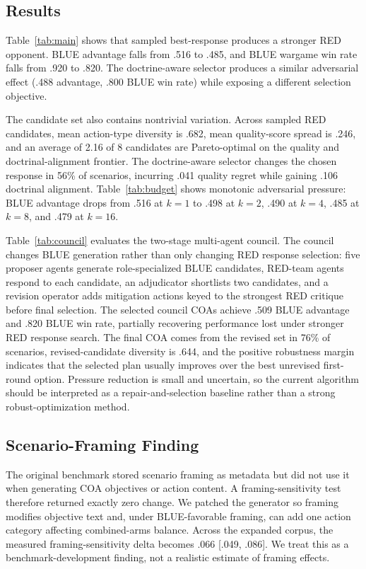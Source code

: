 \documentclass[letterpaper]{article}
\begin{document}
\subsection{Results}

Table~\ref{tab:main} shows that sampled best-response produces a stronger RED opponent. BLUE advantage falls from .516 to .485, and BLUE wargame win rate falls from .920 to .820. The doctrine-aware selector produces a similar adversarial effect (.488 advantage, .800 BLUE win rate) while exposing a different selection objective.

The candidate set also contains nontrivial variation. Across sampled RED candidates, mean action-type diversity is .682, mean quality-score spread is .246, and an average of 2.16 of 8 candidates are Pareto-optimal on the quality and doctrinal-alignment frontier. The doctrine-aware selector changes the chosen response in 56\% of scenarios, incurring .041 quality regret while gaining .106 doctrinal alignment. Table~\ref{tab:budget} shows monotonic adversarial pressure: BLUE advantage drops from .516 at $k=1$ to .498 at $k=2$, .490 at $k=4$, .485 at $k=8$, and .479 at $k=16$.

Table~\ref{tab:council} evaluates the two-stage multi-agent council. The council changes BLUE generation rather than only changing RED response selection: five proposer agents generate role-specialized BLUE candidates, RED-team agents respond to each candidate, an adjudicator shortlists two candidates, and a revision operator adds mitigation actions keyed to the strongest RED critique before final selection. The selected council COAs achieve .509 BLUE advantage and .820 BLUE win rate, partially recovering performance lost under stronger RED response search. The final COA comes from the revised set in 76\% of scenarios, revised-candidate diversity is .644, and the positive robustness margin indicates that the selected plan usually improves over the best unrevised first-round option. Pressure reduction is small and uncertain, so the current algorithm should be interpreted as a repair-and-selection baseline rather than a strong robust-optimization method.

\subsection{Scenario-Framing Finding}

The original benchmark stored scenario framing as metadata but did not use it when generating COA objectives or action content. A framing-sensitivity test therefore returned exactly zero change. We patched the generator so framing modifies objective text and, under BLUE-favorable framing, can add one action category affecting combined-arms balance. Across the expanded corpus, the measured framing-sensitivity delta becomes .066 [.049, .086]. We treat this as a benchmark-development finding, not a realistic estimate of framing effects.
\end{document}
